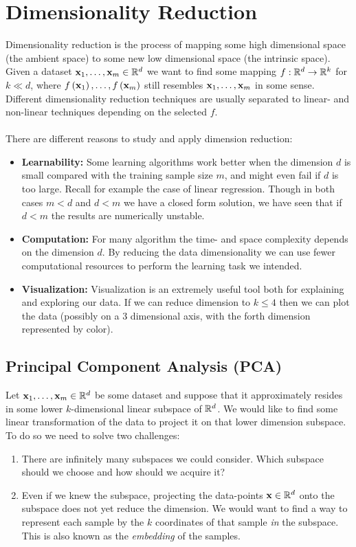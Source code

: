 \section{Dimensionality Reduction}
Dimensionality reduction is the process of mapping some high dimensional space (the ambient space) to some new low dimensional space (the intrinsic space). Given a dataset $\mathbf{x}_1,\ldots,\mathbf{x}_m\in\mathbb{R}^d$ we want to find some mapping $f:\mathbb{R}^d\rightarrow\mathbb{R}^k$ for $k \ll d$, where $f\left(\mathbf{x}_1\right),\ldots,f\left(\mathbf{x}_m\right)$ still resembles $\mathbf{x}_1,\ldots,\mathbf{x}_m$ in some sense. Different dimensionality reduction techniques are usually separated to linear- and non-linear techniques depending on the selected $f$. 
\\~\\
There are different reasons to study and apply dimension reduction:
\begin{itemize}
	\item \textbf{Learnability:} Some learning algorithms work better when the dimension $d$ is small compared with the training sample size $m$, and might even fail if $d$ is too large. Recall for example the case of linear regression. Though in both cases $m<d$ and $d<m$ we have a closed form solution, we have seen that if $d<m$ the results are numerically unstable. \\
	\item \textbf{Computation:} For many algorithm the time- and space complexity depends on the dimension $d$. By reducing the data dimensionality we can use fewer computational resources to perform the learning task we intended. \\
	\item \textbf{Visualization:}  Visualization is an extremely useful tool both for explaining and exploring our data. If we can reduce dimension to $k\leq 4$ then we can plot the data (possibly on a 3 dimensional axis, with the forth dimension represented by color).
\end{itemize}


\subsection{Principal Component Analysis (PCA)}\label{pca}
Let $\mathbf{x}_1,\ldots,\mathbf{x}_m\in\mathbb{R}^d$ be some dataset and suppose that it approximately resides in some lower $k$-dimensional linear subspace of $\mathbb{R}^d$. We would like to find some linear transformation of the data to project it on that lower dimension subspace. To do so we need to solve two challenges:
\begin{enumerate}
	\item There are infinitely many subspaces we could consider. Which subspace should we choose and how should we acquire it?\\
	\item Even if we knew the subspace, projecting the data-points $\mathbf{x}\in\mathbb{R}^d$ onto the subspace does not yet reduce the dimension. We would want to find a way to represent each sample by the $k$ coordinates of that sample \textit{in} the subspace. This is also known as the \textit{embedding} of the samples.
\end{enumerate}~\\

